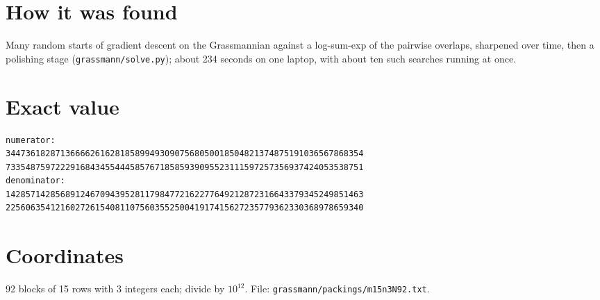 \documentclass[11pt,a4paper]{article}
\begin{document}
\section{How it was found}
Many random starts of gradient descent on the Grassmannian against a log-sum-exp of the pairwise overlaps, sharpened over time, then a polishing stage (\texttt{grassmann/solve.py}); about 234 seconds on one laptop, with about ten such searches running at once.


\appendix
\section{Exact value}
{\small
\begin{verbatim}
numerator:
344736182871366662616281858994930907568050018504821374875191036567868354
733548759722291684345544458576718585939095523111597257356937424053538751
denominator:
142857142856891246709439528117984772162277649212872316643379345249851463
225606354121602726154081107560355250041917415627235779362330368978659340
\end{verbatim}}

\section{Coordinates}
92 blocks of 15 rows with 3 integers each; divide by $10^{12}$. File: \texttt{grassmann/packings/m15n3N92.txt}.
{\tiny
\begin{multicols}{3}
\end{multicols}}
\end{document}

